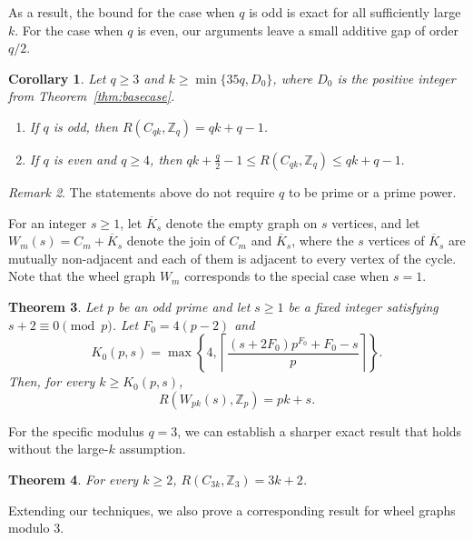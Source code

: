 \documentclass[11pt]{article}
\newtheorem{theorem}{Theorem}[section]
\newtheorem{corollary}[theorem]{Corollary}
\theoremstyle{remark}
\newtheorem{remark}[theorem]{Remark}
\newcommand{\Z}{\mathbb Z}
\begin{document}
As a result, the bound for the case when $q$ is odd is exact for all sufficiently large \(k\).
For the case when $q$ is even, our arguments leave a small additive gap of order \(q/2\).

\begin{corollary}\label{cor:odd-exact}
    Let $q\ge 3$ and $k\ge \min\{35q,D_0\}$, where $D_0$ is the positive integer from Theorem~\ref{thm:basecase}.
    \begin{enumerate}[label=\textup{(\roman*)}]
        \item If $q$ is odd, then $R(C_{qk},\Z_q)= qk+q-1$.
        \item If $q$ is even and $q\ge 4$, then $qk+\frac q2-1
                  \le R(C_{qk},\Z_q)
                  \le qk+q-1.$
    \end{enumerate}
\end{corollary}

\begin{remark}
    The statements above do not require $q$ to be prime or a prime power.
\end{remark}

For an integer $s\ge1$, let $\overline K_s$ denote the empty graph on $s$ vertices, and let $W_m(s)=C_m+\overline K_s$ denote the join of $C_m$ and $\overline K_s$, where the $s$ vertices of $\overline K_s$ are mutually non-adjacent and each of them is adjacent to every vertex of the cycle.
Note that the wheel graph $W_m$ corresponds to the special case when $s=1$.

\begin{theorem}\label{thm:prime-case}
    Let $p$ be an odd prime and let $s\ge1$ be a fixed integer satisfying $s+2\equiv0\pmod p$.  Let $F_0=4(p-2)$ and
    \begin{equation*}
        K_0(p,s)=\max\left\{4,\left\lceil\frac{(s+2F_0)p^{F_0}+F_0-s}{p}\right\rceil\right\}.
    \end{equation*}
    Then, for every $k\ge K_0(p,s)$,
    \[
        R(W_{pk}(s),\Z_p)=pk+s.
    \]
\end{theorem}

For the specific modulus \(q = 3\), we can establish a sharper exact result that holds without the large-\(k\) assumption.

\begin{theorem}\label{thm:q3-cycles}
    For every $k\ge 2$, $R(C_{3k},\Z_3)=3k+2$.
\end{theorem}

Extending our techniques, we also prove a corresponding result for wheel graphs modulo $3$.
\end{document}
